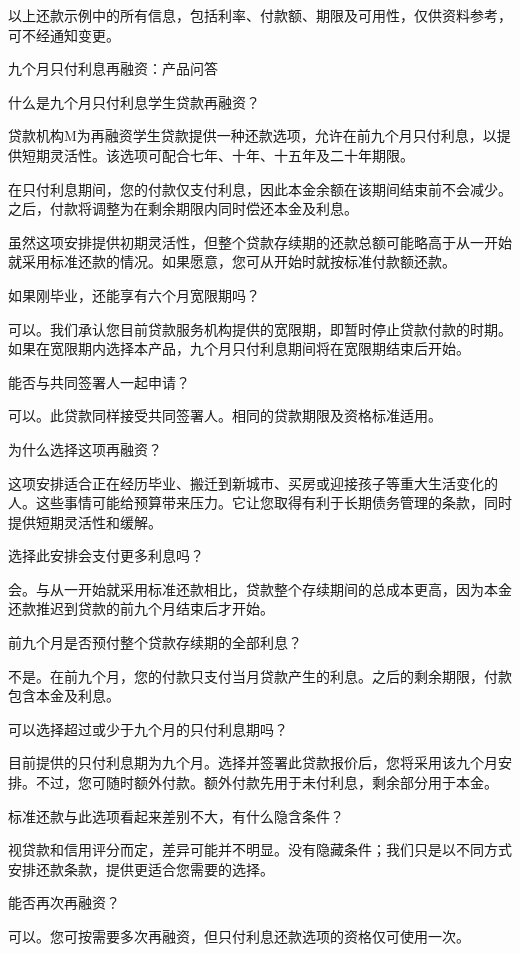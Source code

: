 \documentclass[UTF8,fontset=none,11pt,a4paper]{ctexart}
\begin{document}
以上还款示例中的所有信息，包括利率、付款额、期限及可用性，仅供资料参考，可不经通知变更。


九个月只付利息再融资：产品问答


什么是九个月只付利息学生贷款再融资？


贷款机构M为再融资学生贷款提供一种还款选项，允许在前九个月只付利息，以提供短期灵活性。该选项可配合七年、十年、十五年及二十年期限。


在只付利息期间，您的付款仅支付利息，因此本金余额在该期间结束前不会减少。之后，付款将调整为在剩余期限内同时偿还本金及利息。


虽然这项安排提供初期灵活性，但整个贷款存续期的还款总额可能略高于从一开始就采用标准还款的情况。如果愿意，您可从开始时就按标准付款额还款。


如果刚毕业，还能享有六个月宽限期吗？


可以。我们承认您目前贷款服务机构提供的宽限期，即暂时停止贷款付款的时期。如果在宽限期内选择本产品，九个月只付利息期间将在宽限期结束后开始。


能否与共同签署人一起申请？


可以。此贷款同样接受共同签署人。相同的贷款期限及资格标准适用。


为什么选择这项再融资？


这项安排适合正在经历毕业、搬迁到新城市、买房或迎接孩子等重大生活变化的人。这些事情可能给预算带来压力。它让您取得有利于长期债务管理的条款，同时提供短期灵活性和缓解。


选择此安排会支付更多利息吗？


会。与从一开始就采用标准还款相比，贷款整个存续期间的总成本更高，因为本金还款推迟到贷款的前九个月结束后才开始。


前九个月是否预付整个贷款存续期的全部利息？


不是。在前九个月，您的付款只支付当月贷款产生的利息。之后的剩余期限，付款包含本金及利息。


可以选择超过或少于九个月的只付利息期吗？


目前提供的只付利息期为九个月。选择并签署此贷款报价后，您将采用该九个月安排。不过，您可随时额外付款。额外付款先用于未付利息，剩余部分用于本金。


标准还款与此选项看起来差别不大，有什么隐含条件？


视贷款和信用评分而定，差异可能并不明显。没有隐藏条件；我们只是以不同方式安排还款条款，提供更适合您需要的选择。


能否再次再融资？


可以。您可按需要多次再融资，但只付利息还款选项的资格仅可使用一次。
\end{document}
